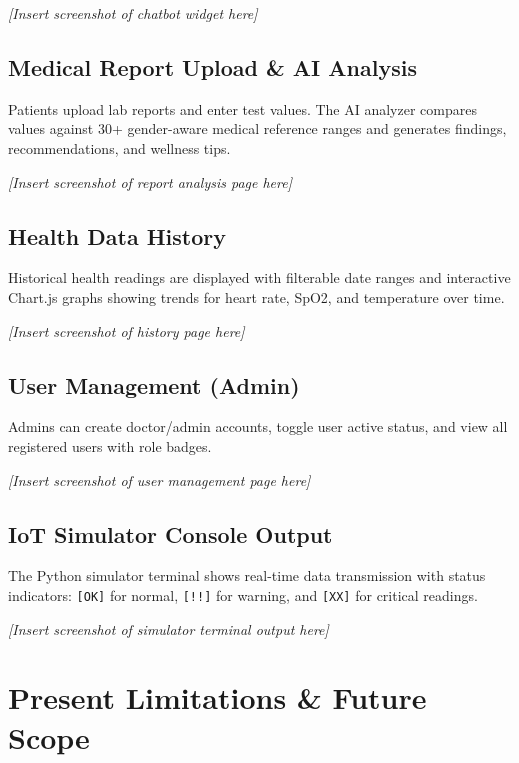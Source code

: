 \documentclass[12pt,a4paper]{report}
\begin{document}
\noindent\textit{[Insert screenshot of chatbot widget here]}

\section{Medical Report Upload \& AI Analysis}
Patients upload lab reports and enter test values. The AI analyzer compares values against 30+ gender-aware medical reference ranges and generates findings, recommendations, and wellness tips.


\noindent\textit{[Insert screenshot of report analysis page here]}

\section{Health Data History}
Historical health readings are displayed with filterable date ranges and interactive Chart.js graphs showing trends for heart rate, SpO2, and temperature over time.

\noindent\textit{[Insert screenshot of history page here]}

\section{User Management (Admin)}
Admins can create doctor/admin accounts, toggle user active status, and view all registered users with role badges.

\noindent\textit{[Insert screenshot of user management page here]}

\section{IoT Simulator Console Output}
The Python simulator terminal shows real-time data transmission with status indicators: \texttt{[OK]} for normal, \texttt{[!!]} for warning, and \texttt{[XX]} for critical readings.

\noindent\textit{[Insert screenshot of simulator terminal output here]}

\chapter{Present Limitations \& Future Scope}
\end{document}
